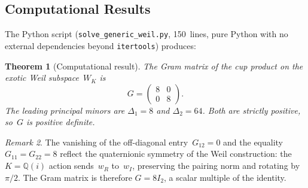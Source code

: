 \documentclass[11pt]{article}
\theoremstyle{plain}
\newtheorem{theorem}{Theorem}[section]
\theoremstyle{definition}
\theoremstyle{remark}
\newtheorem{remark}[theorem]{Remark}
\newcommand{\Q}{\mathbb{Q}}
\begin{document}
\subsection{Computational Results}
\label{sec:results}

The Python script (\texttt{solve\_generic\_weil.py}, 150~lines, pure
Python with no external dependencies beyond \texttt{itertools}) produces:

\begin{theorem}[Computational result]
\label{thm:gram}
The Gram matrix of the cup product on the exotic Weil subspace~$W_K$ is
\[
  G = \begin{pmatrix} 8 & 0 \\ 0 & 8 \end{pmatrix}.
\]
The leading principal minors are $\Delta_1 = 8$ and $\Delta_2 = 64$.
Both are strictly positive, so~$G$ is positive definite.
\end{theorem}

\begin{remark}
The vanishing of the off-diagonal entry~$G_{12} = 0$ and the
equality~$G_{11} = G_{22} = 8$ reflect the quaternionic symmetry of
the Weil construction: the $K = \Q(i)$ action sends~$w_R$ to~$w_I$,
preserving the pairing norm and rotating by~$\pi/2$.  The Gram matrix is
therefore $G = 8I_2$, a scalar multiple of the identity.
\end{remark}
\end{document}
